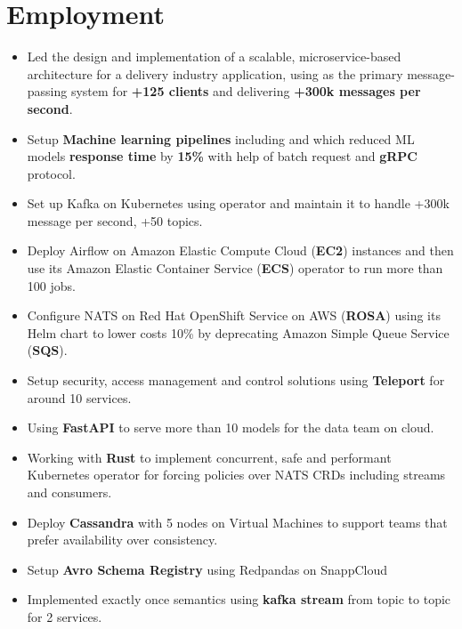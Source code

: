 \section{Employment}

\begin{itemize}
      \item Led the design and implementation of a scalable, microservice-based architecture for a delivery industry application,
            using  as the primary message-passing system for \textbf{+125 clients} and delivering
            \textbf{+300k messages per second}.
      \item Setup \textbf{Machine learning pipelines} including  and
             which reduced ML models \textbf{response time} by \textbf{15\%}
            with help of batch request and \textbf{gRPC} protocol.
      \item Set up Kafka on Kubernetes using  operator and maintain it to handle +300k
            message per second, +50 topics.
      \item Deploy Airflow on Amazon Elastic Compute Cloud (\textbf{EC2}) instances and then use
            its Amazon Elastic Container Service (\textbf{ECS}) operator
            to run more than 100 jobs.
      \item Configure NATS on Red Hat OpenShift Service on AWS (\textbf{ROSA})
            using its Helm chart to lower costs 10\% by deprecating Amazon Simple Queue Service (\textbf{SQS}).
      \item Setup security, access management and control solutions using \textbf{Teleport} for around 10 services.
      \item Using \textbf{FastAPI} to serve more than 10 models for the data team on cloud.
      \item Working with \textbf{Rust} to implement concurrent, safe and performant Kubernetes operator for forcing
            policies over NATS CRDs including streams and consumers.
      \item Deploy \textbf{Cassandra} with 5 nodes on Virtual Machines to support teams that prefer availability over consistency.
      \item Setup \textbf{Avro Schema Registry} using Redpandas on SnappCloud
      \item Implemented exactly once semantics using \textbf{kafka stream} from topic to topic for 2 services.
\end{itemize}

